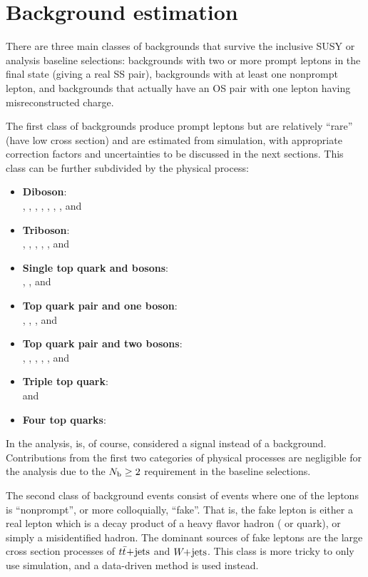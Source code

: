 \chapter{Background estimation}
\label{chap:backgrounds}

There are three main classes of backgrounds that survive the inclusive SUSY or
\smft analysis baseline selections: backgrounds with two or more prompt leptons
in the final state (giving a real SS pair), backgrounds with at least one nonprompt lepton,
and backgrounds that actually have an OS pair with one lepton having misreconstructed charge.

The first class of backgrounds produce prompt leptons
but are relatively ``rare'' (have low cross section) and are estimated from
simulation, with appropriate correction factors and uncertainties to be discussed in the next
sections. This class can be further subdivided by the physical process:

\begin{itemize}
    \item \textbf{Diboson}: \\ \WZ, \ZZ, \WW, \WH, \ZH, \Zgamma, \Wgamma, and \WpWp
    \item \textbf{Triboson}: \\ \WWW, \WWZ, \WZZ, \ZZZ, \WWgamma, and \WZgamma
    \item \textbf{Single top quark and bosons}: \\ \tgamma, \tZgamma, and \tWZ
    \item \textbf{Top quark pair and one boson}: \\ \ttW, \ttZ, \ttH, and \ttgamma
    \item \textbf{Top quark pair and two bosons}: \\ \ttWW, \ttWZ, \ttZZ, \ttWH, \ttZH, and \ttHH
    \item \textbf{Triple top quark}: \\ \ttt and \tttW
    \item \textbf{Four top quarks}: \\ \tttt
\end{itemize}

In the \smft analysis, \tttt is, of course, considered a signal instead of a background.
Contributions from the first two categories of physical processes are negligible for the
\smft analysis due to the $N_\mathrm{b}\geq 2$ requirement in the baseline selections.

The second class of background events consist of events where one of the leptons is
``nonprompt'', or more colloquially, ``fake''. That is, the fake lepton is
either a real lepton which is a decay product of a heavy flavor hadron (\PQb 
or \PQc quark), or simply a misidentified hadron. The dominant sources of fake leptons
are the large cross section processes of $t\bar{t}\!+\!\mathrm{jets}$ and $W\!\!+\!\mathrm{jets}$. This class is more
tricky to only use simulation, and a data-driven method is used instead.

